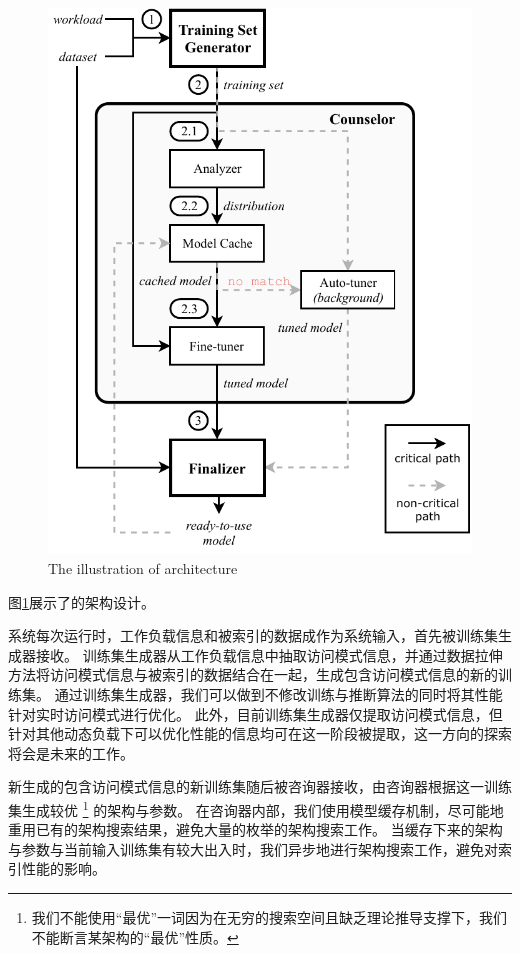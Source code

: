\begin{figure}[!ht]
  \centering
  \includegraphics{figure/Doraemon.pdf}
    {The illustration of \sys architecture}
  \label{fig:arch}
\end{figure}

图\ref{fig:arch}展示了{\sys}的架构设计。

系统每次运行时，工作负载信息和被索引的数据成作为系统输入，首先被训练集生成器接收。
训练集生成器从工作负载信息中抽取访问模式信息，并通过数据拉伸方法将访问模式信息与被索引的数据结合在一起，生成包含访问模式信息的新的训练集。
通过训练集生成器，我们可以做到不修改{\rmi}训练与推断算法的同时将其性能针对实时访问模式进行优化。
此外，目前训练集生成器仅提取访问模式信息，但针对其他动态负载下可以优化{\li}性能的信息均可在这一阶段被提取，这一方向的探索将会是未来的工作。

新生成的包含访问模式信息的新训练集随后被咨询器接收，由咨询器根据这一训练集生成较优
\footnote{我们不能使用“最优”一词因为在无穷的搜索空间且缺乏理论推导支撑下，我们不能断言某{\rmi}架构的“最优”性质。}
的{\rmi}架构与参数。
在咨询器内部，我们使用模型缓存机制，尽可能地重用已有的架构搜索结果，避免大量的枚举的架构搜索工作。
当缓存下来的{\rmi}架构与参数与当前输入训练集有较大出入时，我们异步地进行架构搜索工作，避免对索引性能的影响。

